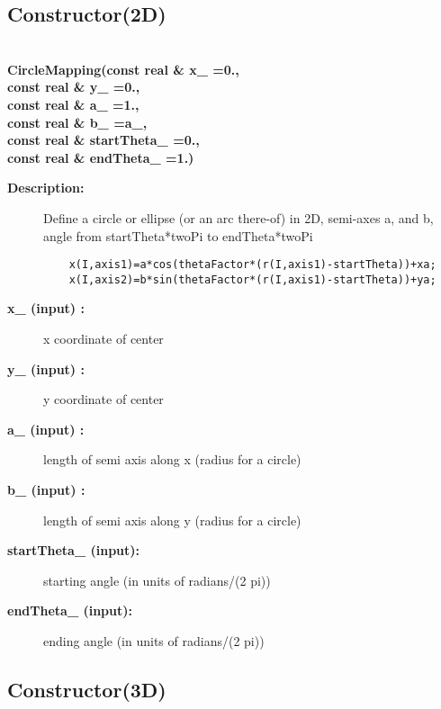 \subsection{Constructor(2D)}
 
\newlength{\CircleMappingIncludeArgIndent}
\begin{flushleft} \textbf{%
  \\ 
\settowidth{\CircleMappingIncludeArgIndent}{CircleMapping(}%
CircleMapping(const real \& x\_  =0., \\ 
\hspace{\CircleMappingIncludeArgIndent}const real \& y\_  =0., \\ 
\hspace{\CircleMappingIncludeArgIndent}const real \& a\_  =1., \\ 
\hspace{\CircleMappingIncludeArgIndent}const real \& b\_  =a\_,\\ 
\hspace{\CircleMappingIncludeArgIndent}const real \& startTheta\_  =0., \\ 
\hspace{\CircleMappingIncludeArgIndent}const real \& endTheta\_  =1.) 
}\end{flushleft}
\begin{description}
\item[{\bf Description:}]  
   Define a circle or ellipse (or an arc there-of) in 2D, 
   semi-axes a, and b, angle from startTheta*twoPi to endTheta*twoPi

 \begin{verbatim}
    x(I,axis1)=a*cos(thetaFactor*(r(I,axis1)-startTheta))+xa; 
    x(I,axis2)=b*sin(thetaFactor*(r(I,axis1)-startTheta))+ya;
 \end{verbatim}

\item[{\bf x\_ (input) :}]  x coordinate of center
\item[{\bf y\_ (input) :}]  y coordinate of center
\item[{\bf a\_ (input) :}]  length of semi axis along x (radius for a circle)
\item[{\bf b\_ (input) :}]  length of semi axis along y (radius for a circle)
\item[{\bf startTheta\_ (input):}]  starting angle (in units of radians/(2 pi))
\item[{\bf endTheta\_ (input):}]  ending angle (in units of radians/(2 pi))
\end{description}
\subsection{Constructor(3D)}
 
